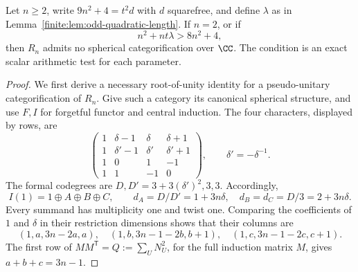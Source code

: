 \begin{proposition}\label{finite:prop:quadratic-family-n3-n4}
Let $n\geq2$, write $9n^2+4=t^2d$ with $d$ squarefree, and define
$\lambda$ as in Lemma~\ref{finite:lem:odd-quadratic-length}.
If $n=2$, or if
\begin{equation}\label{finite:eq:rootlength-parameter}
 n^2+nt\lambda>8n^2+4,
\end{equation}
then $R_n$ admits no spherical categorification over $\CC$.
The condition is an exact scalar arithmetic test for each parameter.
\end{proposition}
\begin{proof}
We first derive a necessary root-of-unity identity for a pseudo-unitary
categorification of $R_n$. Give such a category its canonical spherical
structure, and use $F,I$ for forgetful functor and central induction.
The four characters, displayed by rows, are
\[
 \begin{pmatrix}
 1&\delta-1&\delta&\delta+1\\
 1&\delta'-1&\delta'&\delta'+1\\
 1&0&1&-1\\
 1&1&-1&0
 \end{pmatrix},\qquad \delta'=-\delta^{-1}.
\]
The formal codegrees are $D,D'=3+3(\delta')^2,3,3$. Accordingly,
\[
 I(1)=1\oplus A\oplus B\oplus C,
 \qquad d_A=D/D'=1+3n\delta,\quad d_B=d_C=D/3=2+3n\delta.
\]
Every summand has multiplicity one and twist one. Comparing the coefficients
of $1$ and $\delta$ in their restriction dimensions shows that their columns are
\[
 (1,a,3n-2a,a),\quad
 (1,b,3n-1-2b,b+1),\quad
 (1,c,3n-1-2c,c+1).
\]
The first row of $MM^{\mathsf T}=Q:=\sum_U N_U^2$, for the full induction
matrix $M$, gives $a+b+c=3n-1$.


\end{proof}
